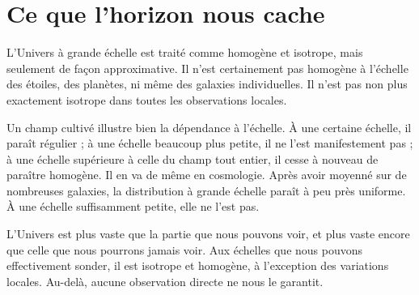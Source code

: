 \begin{classroomqa}\end{classroomqa}

\begin{classroomqa}\end{classroomqa}

\section{Ce que l’horizon nous cache}

L’Univers à grande échelle est traité comme homogène et isotrope, mais seulement de façon approximative. Il n’est certainement pas homogène à l’échelle des étoiles, des planètes, ni même des galaxies individuelles. Il n’est pas non plus exactement isotrope dans toutes les observations locales.

Un champ cultivé illustre bien la dépendance à l’échelle. À une certaine échelle, il paraît régulier ; à une échelle beaucoup plus petite, il ne l’est manifestement pas ; à une échelle supérieure à celle du champ tout entier, il cesse à nouveau de paraître homogène. Il en va de même en cosmologie. Après avoir moyenné sur de nombreuses galaxies, la distribution à grande échelle paraît à peu près uniforme. À une échelle suffisamment petite, elle ne l’est pas.

L’Univers est plus vaste que la partie que nous pouvons voir, et plus vaste encore que celle que nous pourrons jamais voir. Aux échelles que nous pouvons effectivement sonder, il est isotrope et homogène, à l’exception des variations locales. Au-delà, aucune observation directe ne nous le garantit.

